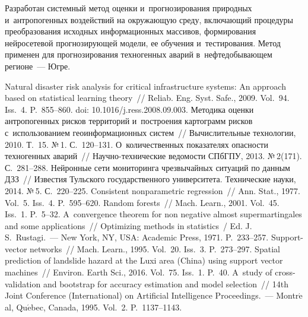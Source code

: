 \begin{multicols}{2}
\vspace*{-4pt}

  Разработан системный метод оценки и~прогнозирования природных 
и~антропогенных воздействий на окружающую среду, включающий процедуры 
преобразования исходных информационных массивов, формирования 
нейросетевой прогнозирующей модели, ее обучения и~тестирования. Метод 
применен для прогнозирования техногенных аварий в~нефтедобывающем 
регионе~--- Югре. 
  
 {\small\frenchspacing
 {%
 \begin{thebibliography}{99}

 Natural disaster risk analysis for critical infrastructure systems: 
An approach based on statistical learning theory~// Reliab. Eng. 
Syst. Safe., 2009. Vol.~94. Iss.~4. P.~855--860. doi: 10.1016/j.ress.2008.09.003.
 Методика оценки 
антропогенных рисков территорий и~построения картограмм рисков 
с~использованием геоинформационных сис\-тем~// Вычислительные 
технологии, 2010. Т.~15. №\,1. С.~120--131. 
 О~количественных 
показателях опасности техногенных аварий~// На\-уч\-но-тех\-ни\-че\-ские 
ведомости СПбГПУ, 2013. №\,2(171). С.~281--288.
 Нейронные сети 
мониторинга чрезвычайных ситуаций по данным ДЗЗ~// Известия Тульского 
государственного университета. Технические науки, 2014. №\,5. С.~220--225.
 Consistent nonparametric regression~// Ann. Stat., 1977. 
Vol.~5. Iss.~4. P.~595--620.
 Random forests~// Mach. Learn., 2001. Vol.~45. Iss.~1. 
P.~5--32.
 A~convergence theorem for non negative almost 
supermartingales and some applications~// Optimizing methods in statistics~/
Ed. J.\,S.~Rustagi.~--- New 
York, NY, USA: Academic Press, 1971. P.~233--257.
 Support-vector networks~// Mach. Learn., 1995. 
Vol.~20. Iss.~3. P.~273--297.
 Spatial prediction of landslide hazard at 
the Luxi area (China) using support vector machines~// Environ. Earth 
Sci., 2016. Vol.~75. Iss.~1. P.~40.
 A~study of cross-validation and bootstrap for accuracy estimation 
and model selection~// 14th Joint Conference (International) on Artificial Intelligence 
Proceedings.~--- Montr$\acute{\mbox{e}}$al, 
Qu$\acute{\mbox{e}}$bec, Canada, 1995. Vol.~2. P.~1137--1143.
 \end{thebibliography}

 }
 }

\end{multicols}

